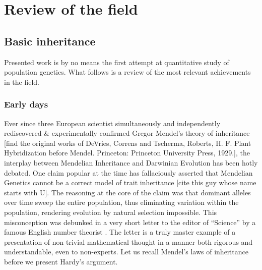 \documentclass{l4proj}
\newif\ifdebug
\begin{document}
\chapter{Review of the field}\label{review}

\ifdebug
  This should be a critical survey of the relevant literature, adhering to normal academic conventions in citing references, etc. Here I need to discuss coalescent method vs. forward-in time method vs. sample-based methods.

explain trait, explain mendelian genetics, explain homozygous, heterozygous, dominant, sweep, polymorphism example of polymorphism: impression of bitterness while eating brussel sprouts, linkage equilibrium, panmictic population, allele, epigenetics, probability density function.
\fi

\section{Basic inheritance}

Presented work is by no means the first attempt at quantitative study of population genetics. What follows is a review of the most relevant achievements in the field.

\subsection{Early days}
Ever since three European scientist simultaneously and independently rediscovered \& experimentally confirmed Gregor Mendel's theory of inheritance [find the original works of DeVries, Correns and Tscherma, Roberts, H. F. Plant Hybridization before Mendel. Princeton: Princeton University Press, 1929.], the interplay between Mendelian Inheritance and Darwinian Evolution has been hotly debated. One claim popular at the time has fallaciously asserted that Mendelian Genetics cannot be a correct model of trait inheritance [cite this guy whose name starts with U]. The reasoning at the core of the claim was that dominant alleles over time sweep the entire population, thus eliminating variation within the population, rendering evolution by natural selection impossible. This misconception was debunked in a very short letter to the editor of ``Science'' by a famous English number theorist \parencite{hardy08}. The letter is a truly master example of a presentation of non-trivial mathematical thought in a manner both rigorous and understandable, even to non-experts. Let us recall Mendel's laws of inheritance before we present Hardy's argument.
\end{document}
